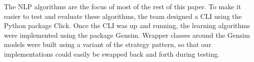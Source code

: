 The NLP algorithms are the focus of most of the rest of this paper.
To make it easier to test and evaluate these algorithms, the team
designed a CLI using the Python package Click.
Once the CLI was up and running, the learning algorithms were
implemented using the package Gensim.
Wrapper classes around the Gensim models were built using a variant of
the strategy pattern, so that our implementations could easily be
swapped back and forth during testing.  

